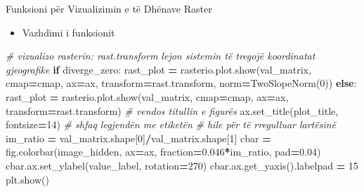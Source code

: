 \documentclass[
  ignorenonframetext,
]{beamer}
\newenvironment{Shaded}{\begin{snugshade}}{\end{snugshade}}
\newcommand{\CommentTok}[1]{\textcolor[rgb]{0.56,0.35,0.01}{\textit{#1}}}
\newcommand{\ControlFlowTok}[1]{\textcolor[rgb]{0.13,0.29,0.53}{\textbf{#1}}}
\newcommand{\DecValTok}[1]{\textcolor[rgb]{0.00,0.00,0.81}{#1}}
\newcommand{\FloatTok}[1]{\textcolor[rgb]{0.00,0.00,0.81}{#1}}
\newcommand{\NormalTok}[1]{#1}
\newcommand{\OperatorTok}[1]{\textcolor[rgb]{0.81,0.36,0.00}{\textbf{#1}}}
\providecommand{\tightlist}{%
  \setlength{\itemsep}{0pt}\setlength{\parskip}{0pt}}
\begin{document}
\begin{frame}[fragile]{Funksioni për Vizualizimin e të Dhënave Raster}
\protect\hypertarget{funksioni-puxebr-vizualizimin-e-tuxeb-dhuxebnave-raster-2}{}
\begin{itemize}
\tightlist
\item
  Vazhdimi i funksionit
\end{itemize}


\begin{Shaded}
\begin{Highlighting}[]
    \CommentTok{\# vizualizo rasterin: rast.transform lejon sistemin të tregojë koordinatat gjeografike}
    \ControlFlowTok{if}\NormalTok{ diverge\_zero:}
\NormalTok{        rast\_plot }\OperatorTok{=}\NormalTok{ rasterio.plot.show(val\_matrix, cmap}\OperatorTok{=}\NormalTok{cmap, ax}\OperatorTok{=}\NormalTok{ax, transform}\OperatorTok{=}\NormalTok{rast.transform, }
\NormalTok{        norm}\OperatorTok{=}\NormalTok{TwoSlopeNorm(}\DecValTok{0}\NormalTok{))}
    \ControlFlowTok{else}\NormalTok{: }
\NormalTok{        rast\_plot }\OperatorTok{=}\NormalTok{ rasterio.plot.show(val\_matrix, cmap}\OperatorTok{=}\NormalTok{cmap, ax}\OperatorTok{=}\NormalTok{ax, transform}\OperatorTok{=}\NormalTok{rast.transform)}
    \CommentTok{\# vendos titullin e figurës}
\NormalTok{    ax.set\_title(plot\_title, fontsize}\OperatorTok{=}\DecValTok{14}\NormalTok{)}
    \CommentTok{\# shfaq legjendën me etiketën}
    \CommentTok{\# hile për të rregulluar lartësinë}
\NormalTok{    im\_ratio }\OperatorTok{=}\NormalTok{ val\_matrix.shape[}\DecValTok{0}\NormalTok{]}\OperatorTok{/}\NormalTok{val\_matrix.shape[}\DecValTok{1}\NormalTok{] }
\NormalTok{    cbar }\OperatorTok{=}\NormalTok{ fig.colorbar(image\_hidden, ax}\OperatorTok{=}\NormalTok{ax, fraction}\OperatorTok{=}\FloatTok{0.046}\OperatorTok{*}\NormalTok{im\_ratio, pad}\OperatorTok{=}\FloatTok{0.04}\NormalTok{)}
\NormalTok{    cbar.ax.set\_ylabel(value\_label, rotation}\OperatorTok{=}\DecValTok{270}\NormalTok{)}
\NormalTok{    cbar.ax.get\_yaxis().labelpad }\OperatorTok{=} \DecValTok{15}
\NormalTok{    plt.show()}
\end{Highlighting}
\end{Shaded}
\end{frame}
\end{document}
